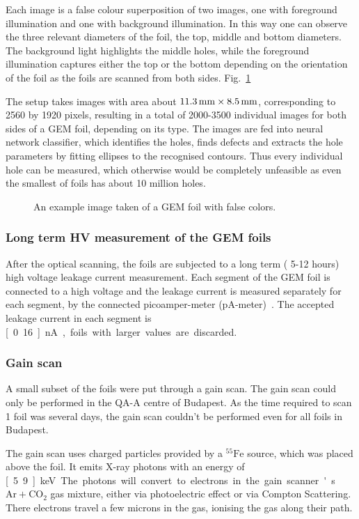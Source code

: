 Each image is a false colour superposition of two images, one with foreground illumination and one with background illumination. In this way one can observe the three relevant diameters of the foil, the top, middle and bottom diameters. The background light highlights the middle holes, while the foreground illumination captures either the top or the bottom depending on the orientation of the foil as the foils are scanned from both sides. Fig.~\ref{fig:gemscan}

The setup takes images with area about $\unit[11.3]{mm} \times \unit[8.5]{mm}$, corresponding to 2560 by 1920 pixels, resulting in a total of 2000-3500 individual images for both sides of a GEM foil, depending on its type. The images are fed into neural network classifier, which identifies the holes, finds defects and extracts the hole parameters by fitting ellipses to the recognised contours. Thus every individual hole can be measured, which otherwise would be completely unfeasible as even the smallest of foils has about 10 million holes.

\begin{figure}
\caption{An example image taken of a GEM foil with false colors.}
\label{fig:gemscan}
\end{figure}

\subsubsection*{Long term HV measurement of the GEM foils}
After the optical scanning, the foils are subjected to a long term ( 5-12 hours) high voltage leakage current measurement. Each segment of the GEM foil is connected to a high voltage and the leakage current is measured separately for each segment, by the connected picoamper-meter (pA-meter)~\cite{}. The accepted leakage current in each segment is \unit[0.16]{nA}, foils with larger values are discarded. 

\subsubsection*{Gain scan}
A small subset of the foils were put through a gain scan. The gain scan could only be performed in the QA-A centre of Budapest. As the time required to scan 1 foil was several days, the gain scan couldn't be performed even for all foils in Budapest. 

The gain scan uses charged particles provided by a $\mathrm{^{55} Fe}$ source, which was placed above the foil. It emits X-ray photons with an energy of \unit[5.9]{keV}. The photons will convert to electrons in the gain scanner's $\mathrm{Ar+CO_2}$ gas mixture, either via photoelectric effect or via Compton Scattering. There electrons travel a few microns in the gas, ionising the gas along their path.

